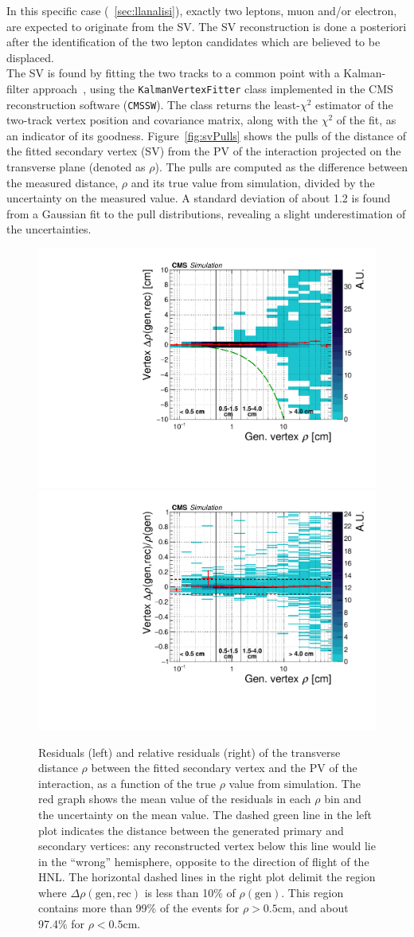 In this specific case (~\ref{sec:llanalisi}), exactly two leptons, muon and/or electron, are
expected to originate from the SV. The SV reconstruction is done a
posteriori after the identification of the two lepton candidates which
are believed to be displaced. \\
The SV is found by fitting the two tracks to a common point with a Kalman-filter
approach~\cite{BILLOIR1990219}, using the \texttt{KalmanVertexFitter}
class implemented in the CMS reconstruction software (\texttt{CMSSW}).
The class returns the least-$\chi^2$ estimator of the two-track vertex
position and covariance matrix, along with the $\chi^2$ of the fit, as
an indicator of its goodness.
Figure~\ref{fig:svPulls} shows the pulls of the distance of the fitted
secondary vertex (SV) from the PV of the interaction projected on the
transverse plane (denoted as $\rho$). The pulls
are computed as the difference between the measured distance, $\rho$
and its true value from simulation, divided by the uncertainty
on the measured value. A standard deviation of about 1.2 is found from
a Gaussian fit to the pull distributions, revealing a slight
underestimation of the uncertainties.
\begin{figure}[h!]
  \centering
  \includegraphics[width=.4\textwidth]{Figures/c6/selection/genvtx_recvtx_Drho_vs_rho_afterSel_zoom.pdf}
  \includegraphics[width=.4\textwidth]{Figures/c6/selection/genvtx_recvtx_RelDrho_vs_rho_afterSel_zoom.pdf}
  \caption{Residuals (left) and relative residuals (right) of the
    transverse distance $\rho$ between the fitted secondary vertex and
    the PV of the interaction, as a function of the true $\rho$ value
    from simulation. 
    The red graph shows the mean value of the
    residuals in each $\rho$ bin and the uncertainty on the mean
    value. The dashed green line in the left plot indicates the
    distance between the generated primary and secondary vertices: any
    reconstructed vertex below this line would lie in the ``wrong''
    hemisphere, opposite to the direction of flight of the HNL.
    The horizontal dashed lines in the right plot delimit the region
    where $\Delta\rho(\mathrm{gen,rec})$ is less than 10\% of
    $\rho(\mathrm{gen})$. This region contains more than 99\% of
    the events for $\rho>0.5$cm, and about 97.4\% for $\rho<0.5$cm.
    \dani}
  \label{fig:svResidVsRho_all}
\end{figure}

